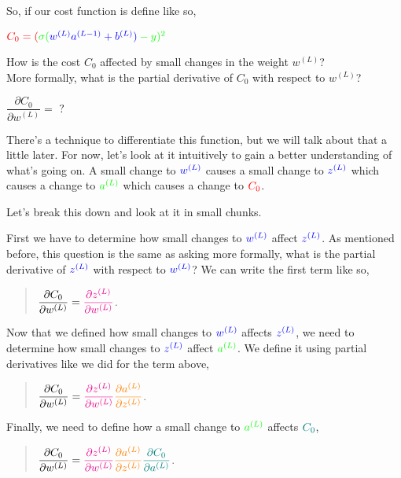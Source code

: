 \documentclass[11pt]{article}
\begin{document}
So, if our cost function is define like so,

\(\color{red}{ C_0 = (\color{green}{ \sigma(\color{blue}{ w^{(L)}a^{(L-1)}+b^{(L)} }) } - y)^{2} }\)

How is the cost \(C_0\) affected by small changes in the weight
\(w^{(L)}\)?\\
More formally, what is the partial derivative of \(C_0\) with respect to
\(w^{(L)}\)?

\(\dfrac{\partial C_0}{\partial w^{(L)}} = \text{ ? }\)

There's a technique to differentiate this function, but we will talk
about that a little later. For now, let's look at it intuitively to gain
a better understanding of what's going on. A small change to
\(\color{blue}{ w^{(L)} }\) causes a small change to
\(\color{blue}{ z^{(L)} }\) which causes a change to
\(\color{green}{ a^{(L)} }\) which causes a change to
\(\color{red}{ C_0 }\).

Let's break this down and look at it in small chunks.

First we have to determine how small changes to
\(\color{blue}{ w^{(L)} }\) affect \(\color{blue}{ z^{(L)} }\). As
mentioned before, this question is the same as asking more formally,
what is the partial derivative of \(\color{blue}{ z^{(L)} }\) with
respect to \(\color{blue}{ w^{(L)} }\)? We can write the first term like
so,

\begin{quote}
\(\dfrac{\partial C_0}{\partial w^{(L)}} = \color{magenta}{ \dfrac{\partial z^{(L)}}{\partial w^{(L)}} }\).
\end{quote}

Now that we defined how small changes to \(\color{blue}{ w^{(L)} }\)
affects \(\color{blue}{ z^{(L)} }\), we need to determine how small
changes to \(\color{blue}{ z^{(L)} }\) affect
\(\color{green}{ a^{(L)} }\). We define it using partial derivatives
like we did for the term above,

\begin{quote}
\(\dfrac{\partial C_0}{\partial w^{(L)}} = \color{magenta}{ \dfrac{\partial z^{(L)}}{\partial w^{(L)}} } \color{orange}{ \dfrac{\partial a^{(L)}}{\partial z^{(L)}} }\).
\end{quote}

Finally, we need to define how a small change to
\(\color{green}{ a^{(L)} }\) affects \(\color{teal}{ C_0 }\),

\begin{quote}
\(\dfrac{\partial C_0}{\partial w^{(L)}} = \color{magenta}{ \dfrac{\partial z^{(L)}}{\partial w^{(L)}} } \color{orange}{ \dfrac{\partial a^{(L)}}{\partial z^{(L)}} } \color{teal}{ \dfrac{\partial C_0}{\partial a^{(L)}} }\).
\end{quote}
\end{document}
